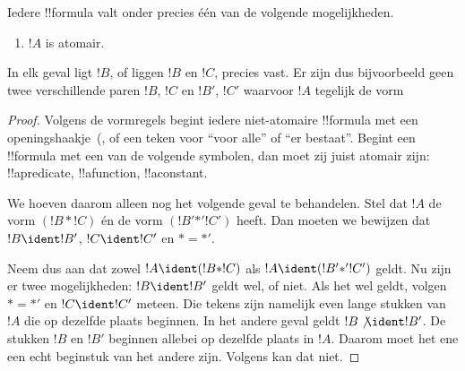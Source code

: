 \documentclass[../../../include/open-logic-section]{subfiles}
\begin{document}
\begin{prop}
Iedere !!{formula} valt onder precies één van de volgende mogelijkheden.
\begin{enumerate}
\item $!A$ is atomair.







\end{enumerate}
In elk geval ligt $!B$, of liggen $!B$ en $!C$, precies vast. Er
zijn dus bijvoorbeeld geen twee verschillende paren $!B$, $!C$ en
$!B'$, $!C'$ waarvoor $!A$ tegelijk de vorm
\end{prop}

\begin{proof}
Volgens de vormregels begint iedere niet-atomaire !!{formula} met een
openingshaakje~(,  of een teken voor
``voor alle'' of ``er bestaat''. Begint een
!!{formula} met een van de volgende symbolen, dan moet zij juist
atomair zijn: !!a{predicate}, !!a{function}, !!a{constant}.

We hoeven daarom alleen nog het volgende geval te behandelen. Stel dat
$!A$ de vorm $(!B \ast !C)$ én de vorm $(!B' \mathbin{\ast'} !C')$
heeft. Dan moeten we bewijzen dat $!B \ident !B'$, $!C \ident !C'$ en
$\ast = {\ast'}$.

Neem dus aan dat zowel $!A \ident (!B \ast !C)$ als $!A \ident (!B'
\mathbin{\ast'} !C')$ geldt. Nu zijn er twee mogelijkheden: $!B \ident
!B'$ geldt wel, of niet. Als het wel geldt, volgen $\ast = {\ast'}$ en
$!C \ident !C'$ meteen. Die tekens zijn namelijk even lange stukken
van $!A$ die op dezelfde plaats beginnen. In het andere geval geldt
$!B \not\ident !B'$. De stukken $!B$ en $!B'$ beginnen allebei op
dezelfde plaats in $!A$. Daarom moet het ene een echt beginstuk van het
andere zijn. Volgens  kan dat niet.
\end{proof}
\end{document}
